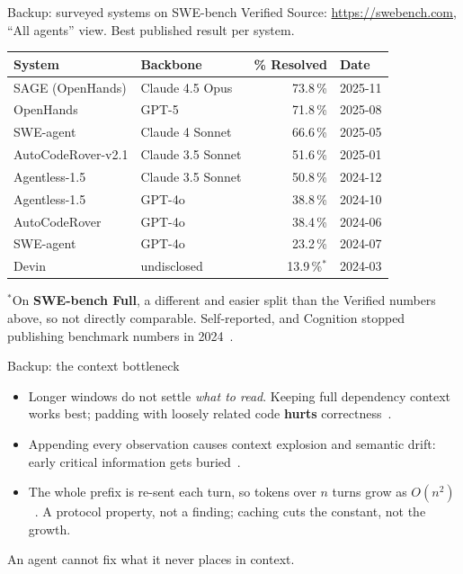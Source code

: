 \documentclass[
  aspectratio=169,
  font=times,
  sectionpage=true,
]{tumbeamer}
\begin{document}
\begin{frame}[noframenumbering]{Backup: surveyed systems on SWE-bench Verified}
  {\scriptsize Source: \url{https://swebench.com}, ``All agents'' view.
  Best published result per system.}

  \medskip
  \small
  \begin{tabular}{@{}L{0.30\textwidth}L{0.30\textwidth}rl@{}}
    \toprule
    \textbf{System} & \textbf{Backbone} & \textbf{\% Resolved} & \textbf{Date} \\
    \midrule
    SAGE (OpenHands)
      & Claude 4.5 Opus   & 73.8\,\% & 2025-11 \\
    OpenHands
      & GPT-5             & 71.8\,\% & 2025-08 \\
    SWE-agent
      & Claude 4 Sonnet   & 66.6\,\% & 2025-05 \\
    AutoCodeRover-v2.1
      & Claude 3.5 Sonnet & 51.6\,\% & 2025-01 \\
    Agentless-1.5
      & Claude 3.5 Sonnet & 50.8\,\% & 2024-12 \\
    Agentless-1.5
      & GPT-4o            & 38.8\,\% & 2024-10 \\
    AutoCodeRover
      & GPT-4o            & 38.4\,\% & 2024-06 \\
    SWE-agent
      & GPT-4o            & 23.2\,\% & 2024-07 \\
    Devin
      & undisclosed       & 13.9\,\%$^*$ & 2024-03 \\
    \bottomrule
  \end{tabular}

  \smallskip
  {\scriptsize $^*$On \textbf{SWE-bench Full}, a different and easier split
  than the Verified numbers above, so not directly comparable. Self-reported,
  and Cognition stopped publishing benchmark numbers in
  2024~\cite{cognition2024devin}.}
\end{frame}

\begin{frame}[noframenumbering]{Backup: the context bottleneck}
  \begin{itemize}
    \item Longer windows do not settle \emph{what to read}. Keeping full
      dependency context works best; padding with loosely related code
      \textbf{hurts} correctness~\cite{repoexec2025}.
      \medskip
    \item Appending every observation causes context explosion and semantic
      drift: early critical information gets buried~\cite{contextastool2025}.
      \medskip
    \item The whole prefix is re-sent each turn, so tokens over $n$ turns grow as
      $O(n^2)$~\cite{turncontrol2025}. A protocol property, not a finding;
      caching cuts the constant, not the growth.
  \end{itemize}

  \bigskip
  {\small An agent cannot fix what it never places in context.}
\end{frame}
\end{document}
